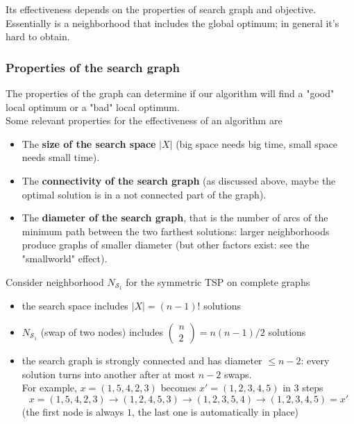 \documentclass[11pt]{article}
\begin{document}
	Its effectiveness depends on the properties of search graph and objective.\\
	
	Essentially is a neighborhood that includes the global optimum; in general it's hard to obtain.\\
	
	\newpage
	
	\subsubsection{Properties of the search graph}
	The properties of the graph can determine if our algorithm will find a "good" local optimum or a "bad" local optimum.\\
	
	Some relevant properties for the effectiveness of an algorithm are
	\begin{itemize}
		\item The \textbf{size of the search space} $|X|$ (big space needs big time, small space needs small time).\\
		
		\item The \textbf{connectivity of the search graph} (as discussed above, maybe the optimal solution is in a not connected part of the graph).\\
		
		\item The \textbf{diameter of the search graph}, that is the number of arcs of the minimum path between the two farthest solutions: larger neighborhoods produce graphs of smaller diameter (but other factors exist: see the "smallworld" effect).\\
	\end{itemize}
	\nn
	
	Consider neighborhood $N_{\mathcal{S}_1}$ for the symmetric TSP on complete graphs
	\begin{itemize}
		\item the search space includes $|X| = (n − 1)!$ solutions
		
		\item $N_{\mathcal{S}_1}$ (swap of two nodes) includes $\left(\begin{array}{c}
			n \\ 2 \end{array}\right) = n(n-1)/2$ solutions
			
		\item the search graph is strongly connected and has diameter $\leq n - 2$: every solution turns into another after at most $n - 2$ swaps.\\
		For example, $x = (1, 5, 4, 2, 3)$ becomes $x' = (1, 2, 3, 4, 5)$ in $3$ steps
		$$ x = (1, 5, 4, 2, 3) \rightarrow (1, 2, 4, 5, 3) \rightarrow (1, 2, 3, 5, 4) \rightarrow (1, 2, 3, 4, 5) = x' $$
		(the first node is always $1$, the last one is automatically in place)
	\end{itemize}
	
\end{document}
